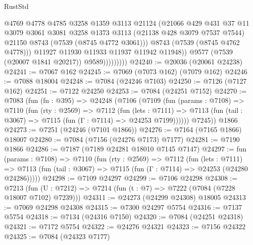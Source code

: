 \begin{lexlean}{RustStd}
\begin{coremodule}
                            @4769
                            @4778
                            @4785
                            @3258
                            @1359
                            @3113
                            @21124
                            (@21066
                              @429
                              @431
                              @37
                              @11
                              @3079
                              @3061
                              @3081
                              @3258
                              @1373
                              @3113
                              (@21138 @428 @3079 @7537 @7544)
                              @21150
                              @8743
                              (@7539 (@8745 @4772 @3061)))
                            @8743
                            (@7539 (@8745 @4762 @4778)))
                          @11927
                          @11930
                          @11933
                          @11937
                          @11942
                          @11948))
                      @9577
                      (@7539 (@20007 @1841 @20217))
                      @9589)))))))))
@24240 := @20036 (@20061 @24238)
@24241 := @7067 @162
@24245 := @7069 (@7073 @162) (@7079 @162)
@24246 := @7088 @18004
@24248 := @7084 (@24246 @7103)
@24250 := @7126 (@7127 @162)
@24251 := @7122 @24250
@24253 := @7084 (@24251 @7152)
@24270 := @7083
    (fun (fn : @395) =>
    @24248
      (@7106
        (@7109
          (fun (params : @7108) =>
          @7110
            (fun (rty : @2569) =>
            @7112
              (fun (lets : @7111) =>
              @7113 (fun (tail : @3067) => @7115 (fun (Γ : @7114) => @24253 @7199))))))
        @7245))
    @1866
@24273 := @7251 (@24246 (@7101 @1866))
@24276 := @7164 (@7165 @1866) @18007
@24280 := @7084 (@7156 (@24276 @7173) @7177)
@24281 := @7190 @1866
@24286 := @7187 (@7189 @24281 @18010 @7145 @7147)
@24297 := fun (params : @7108) =>
  @7110
    (fun (rty : @2569) =>
    @7112
      (fun (lets : @7111) =>
      @7113 (fun (tail : @3067) => @7115 (fun (Γ : @7114) => @24253 (@24280 @24286)))))
@24298 := @7109 @24297
@24299 := @7106 @24298
@24308 := @7213
    (fun (U : @7212) => @7214 (fun (t : @7) => @7222 (@7084 (@7228 @18007 @7102) @7239)))
@24311 := @24273 (@24299 @24308) @18005
@24313 := @7069 @24298 @24308
@24315 := @7300 @24297 @5754
@24316 := @7137 @5754
@24318 := @7134 (@24316 @7150)
@24320 := @7084 (@24251 @24318)
@24321 := @7172 @5754
@24322 := @24276 @24321
@24323 := @7156 @24322
@24325 := @7084 (@24323 @7177)

\end{coremodule}
\end{lexlean}
